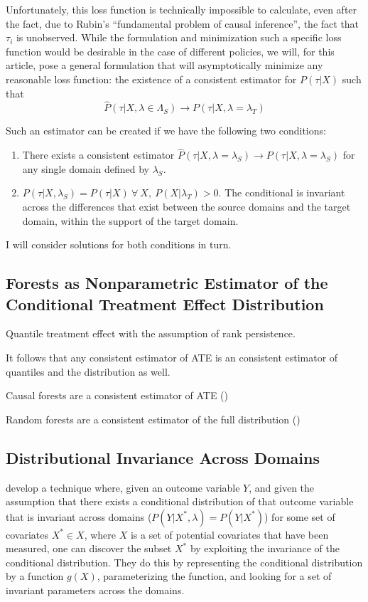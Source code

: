 \documentclass[a4paper,12pt]{article}
\begin{document}
Unfortunately, this loss function is technically impossible to calculate, even after the fact, due to Rubin's ``fundamental problem of causal inference'', the fact that $\tau_i$ is unobserved. While the formulation and minimization such a specific loss function would be desirable in the case of different policies, we will, for this article, pose a general formulation that will asymptotically minimize any reasonable loss function: the existence of a consistent estimator for $P(\tau | X)$ such that
%
$$
\hat{P}(\tau | X, \lambda \in \Lambda_S) \rightarrow P(\tau | X, \lambda = \lambda_T)
$$

Such an estimator can be created if we have the following two conditions: 

\begin{enumerate}
\item There exists a consistent estimator $\hat{P}(\tau | X, \lambda = \lambda_S) \rightarrow P(\tau | X, \lambda = \lambda_S)$ for any single domain defined by $\lambda_S$. 
\item $P(\tau | X, \lambda_S) = P(\tau | X) \ \forall \ X, \ P(X | \lambda_T) > 0$. The conditional is invariant across the differences that exist between the source domains and the target domain, within the support of the target domain. 
\end{enumerate}

I will consider solutions for both conditions in turn. 

\subsection*{Forests as Nonparametric Estimator of the Conditional Treatment Effect Distribution}

Quantile treatment effect with the assumption of rank persistence. 

It follows that any consistent estimator of ATE is an consistent estimator of quantiles and the distribution as well. 

Causal forests are a consistent estimator of ATE (\cite{})

Random forests are a consistent estimator of the full distribution (\cite{})


\subsection*{Distributional Invariance Across Domains}

\cite{Peters2015} develop a technique where, given an outcome variable $Y$, and given the assumption that there exists a conditional distribution of that outcome variable that is invariant across domains ($P(Y | X^*, \lambda) = P(Y | X^*)$) for some set of covariates $X^* \in X$, where $X$ is a set of potential covariates that have been measured, one can discover the subset $X^*$ by exploiting the invariance of the conditional distribution. They do this by representing the conditional distribution by a function $g(X)$, parameterizing the function, and looking for a set of invariant parameters across the domains. 
\end{document}
